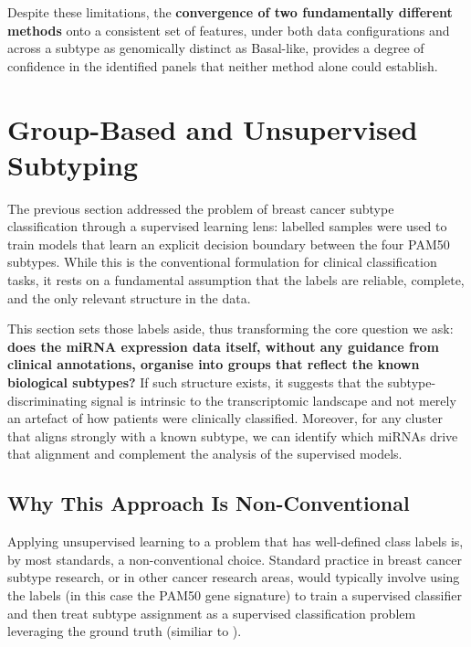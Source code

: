Despite these limitations, the \textbf{convergence of two fundamentally different methods}
onto a consistent set of features, under both data configurations and across a subtype
as genomically distinct as Basal-like, provides a degree of confidence in the identified
panels that neither method alone could establish.

\FloatBarrier

\section{Group-Based and Unsupervised Subtyping}
\label{sec:unsupervised}

The previous section addressed the problem of breast cancer subtype classification through
a supervised learning lens: labelled samples were used to train models that learn an explicit
decision boundary between the four PAM50 subtypes. While this is the conventional formulation
for clinical classification tasks, it rests on a fundamental assumption that the labels are
reliable, complete, and the only relevant structure in the data.

This section sets those labels aside, thus transforming the core question we ask:
\textbf{does the miRNA expression data itself, without any guidance from clinical annotations,
organise into groups that reflect the known biological subtypes?} If such structure exists, it
suggests that the subtype-discriminating signal is intrinsic to the transcriptomic landscape and
not merely an artefact of how patients were clinically classified. Moreover, for any cluster
that aligns strongly with a known subtype, we can identify which miRNAs drive that alignment 
and complement the analysis of the supervised models.

\subsection{Why This Approach Is Non-Conventional}
\label{sec:unsupervised:nonconventional}

Applying unsupervised learning to a problem that has well-defined class labels is, by most
standards, a non-conventional choice. Standard practice in breast cancer subtype research, 
or in other cancer research areas, would typically involve using the labels (in 
this case the PAM50 gene signature) to train a supervised classifier and then
treat subtype assignment as a supervised classification problem leveraging the ground truth (similiar to \cite{ml_gastric_Azari2023}).

